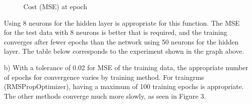 \documentclass[11pt]{article}
\begin{document}
\begin{enumerate}
\begin{figure}[h!]
\begin{minipage}{0.45\textwidth}
        \caption{Cost (MSE) at epoch}
    \end{minipage}
\end{figure}\newline
Using 8 neurons for the hidden layer is appropriate for this function. The MSE for the test data with 8 neurons is better that is required, and the training converges after fewer epochs than the network using 50 neurons for the hidden layer.\newline
The table below corresponds to the experiment shown in the graph above.\newline



b) With a tolerance of 0.02 for MSE of the training data, the appropriate number of epochs for convergence varies by training method. For traingrms (RMSPropOptimizer), having a maximum of 100 training epochs is appropriate. The other methods converge much more slowly, as seen in Figure 3. \newline


\end{enumerate}
\end{document}
